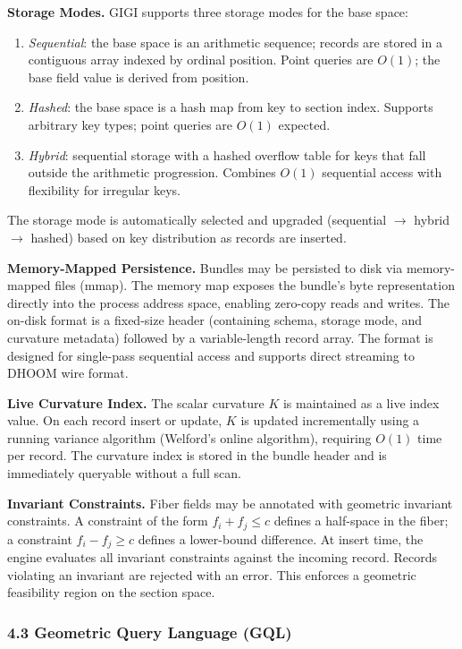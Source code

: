 \documentclass[11pt,letterpaper]{article}
\begin{document}
\textbf{Storage Modes.} GIGI supports three storage modes for the base space:
\begin{enumerate}[nosep]
  \item \emph{Sequential}: the base space is an arithmetic sequence; records are stored in a contiguous array indexed by ordinal position. Point queries are $O(1)$; the base field value is derived from position.
  \item \emph{Hashed}: the base space is a hash map from key to section index. Supports arbitrary key types; point queries are $O(1)$ expected.
  \item \emph{Hybrid}: sequential storage with a hashed overflow table for keys that fall outside the arithmetic progression. Combines $O(1)$ sequential access with flexibility for irregular keys.
\end{enumerate}
The storage mode is automatically selected and upgraded (sequential $\to$ hybrid $\to$ hashed) based on key distribution as records are inserted.

\textbf{Memory-Mapped Persistence.} Bundles may be persisted to disk via memory-mapped files (mmap). The memory map exposes the bundle's byte representation directly into the process address space, enabling zero-copy reads and writes. The on-disk format is a fixed-size header (containing schema, storage mode, and curvature metadata) followed by a variable-length record array. The format is designed for single-pass sequential access and supports direct streaming to DHOOM wire format.

\textbf{Live Curvature Index.} The scalar curvature $K$ is maintained as a live index value. On each record insert or update, $K$ is updated incrementally using a running variance algorithm (Welford's online algorithm), requiring $O(1)$ time per record. The curvature index is stored in the bundle header and is immediately queryable without a full scan.

\textbf{Invariant Constraints.} Fiber fields may be annotated with geometric invariant constraints. A constraint of the form $f_i + f_j \leq c$ defines a half-space in the fiber; a constraint $f_i - f_j \geq c$ defines a lower-bound difference. At insert time, the engine evaluates all invariant constraints against the incoming record. Records violating an invariant are rejected with an error. This enforces a geometric feasibility region on the section space.


\subsubsection*{4.3 Geometric Query Language (GQL)}
\end{document}
